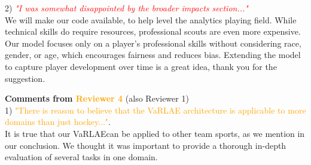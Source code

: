 \documentclass{article}
\newcommand{\system}{VaRLAE\;}
\begin{document}
2) \textcolor{Red}{\it "I was somewhat disappointed by the broader impacts section..."}\\
We will make our code available, to help level the analytics playing field. While technical skills do require resources, professional scouts are even more expensive. 
Our model focuses only on a player's professional skills without considering race, gender, or age, which encourages fairness and reduces bias. Extending the model to capture player development over time is a great idea, thank you for the suggestion.

{\bf Comments from \textcolor{orange}{Reviewer 4}} (also Reviewer 1)\\
1) \textcolor{orange}{"There is reason to believe that the VaRLAE architecture is applicable to more domains than just hockey..."}. \\
It is true that our \system can be applied to other team sports, as we mention in our conclusion. We thought it was important to provide a thorough in-depth evaluation of several tasks in one domain. 
\end{document}
